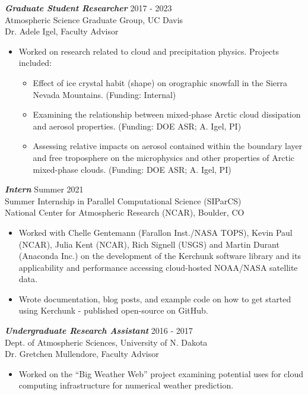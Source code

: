 \documentclass[overlapped]{res}
\begin{document}
\begin{resume}
    {\sl \textbf{Graduate Student Researcher}} \hfill 2017 - 2023 \\
    Atmospheric Science Graduate Group, UC Davis \\
    Dr. Adele Igel, Faculty Advisor \\
    \begin{itemize}
        \item Worked on research related to cloud and precipitation physics. Projects included:
        \begin{itemize} \itemsep -2pt
            \item Effect of ice crystal habit (shape) on orographic snowfall in the Sierra Nevada Mountains. (Funding: Internal)
            \item Examining the relationship between mixed-phase Arctic cloud dissipation and aerosol properties. (Funding: DOE ASR; A. Igel, PI) 
            \item Assessing relative impacts on aerosol contained within the boundary layer and free troposphere on the microphysics and other properties of Arctic mixed-phase clouds. (Funding: DOE ASR; A. Igel, PI)
        \end{itemize}
    \end{itemize}

    {\sl \textbf{Intern}} \hfill Summer 2021 \\
    Summer Internship in Parallel Computational Science (SIParCS) \\
    National Center for Atmospheric Research (NCAR), Boulder, CO \\
    \begin{itemize}
        \item Worked with Chelle Gentemann (Farallon Inst./NASA TOPS), Kevin Paul (NCAR), Julia Kent (NCAR), Rich Signell (USGS) and Martin Durant (Anaconda Inc.) on the development of the Kerchunk software library and its applicability and performance accessing cloud-hosted NOAA/NASA satellite data.
        \item Wrote documentation, blog posts, and example code on how to get started using Kerchunk - published open-source on GitHub.
    \end{itemize} 
    {\sl \textbf{Undergraduate Research Assistant}} \hfill 2016 - 2017 \\
    Dept. of Atmospheric Sciences, University of N. Dakota \\
    Dr. Gretchen Mullendore, Faculty Advisor \\
    \begin{itemize}\itemsep -2pt
        \item Worked on the “Big Weather Web” project examining potential uses for cloud computing infrastructure for numerical weather prediction.
    \end{itemize}


\end{resume}
\end{document}
